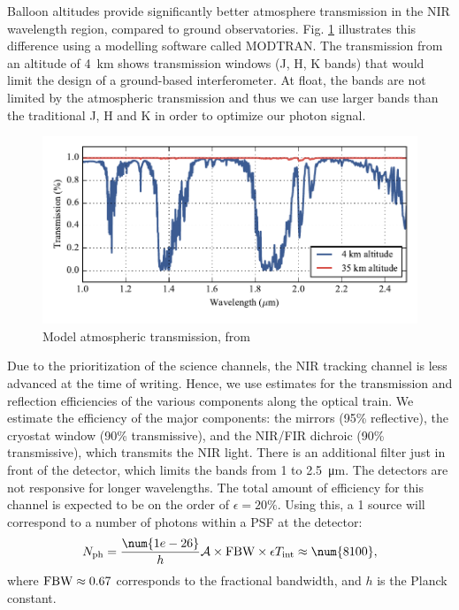Balloon altitudes provide significantly better atmosphere transmission in the NIR wavelength region, compared to ground observatories. Fig. \ref{fig:trans} illustrates this difference using a modelling software called MODTRAN. The transmission from an altitude of 4~km shows transmission windows (J, H, K bands) that would limit the design of a ground-based interferometer. At float, the bands are not limited by the atmospheric transmission and thus we can use larger bands than the traditional J, H and K in order to optimize our photon signal.

\begin{figure}[ht!]
\begin{center}
\includegraphics[width=\textwidth]{Figures/BETTII_atmo_transmission.pdf}
\vspace{-0.5cm}
\caption{Model atmospheric transmission, from \cite{Rizzo:2012jp}}
\label{fig:trans}
\end{center}
\end{figure}

Due to the prioritization of the science channels, the NIR tracking channel is less advanced at the time of writing. Hence, we use estimates for the transmission and reflection efficiencies of the various components along the optical train. We estimate the efficiency of the major components: the mirrors (95\% reflective), the cryostat window (90\% transmissive), and the NIR/FIR dichroic (90\% transmissive), which transmits the NIR light. There is an additional filter just in front of the detector, which limits the bands from 1 to \SI{2.5}{\micro\meter}. The detectors are not responsive for longer wavelengths. The total amount of efficiency for this channel is expected to be on the order of $\epsilon = 20\%$. Using this, a \SI{1}{\jansky} source will correspond to a number of photons \Nph within a PSF at the detector:
\begin{align}
\Nph = \frac{\num{1e-26}}{h}\Area\times\FBW\times\epsilon\Tint \approx \num{8100},
\end{align}
where $\textrm{FBW} \approx 0.67$ corresponds to the fractional bandwidth, and $h$ is the Planck constant. 


